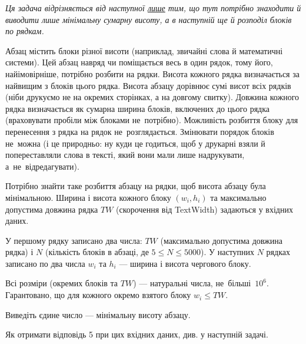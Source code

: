 ﻿{\it Ця задача відрізняється від наступної \underline{лише} тим, що тут потрібно знаходити й виводити лише мінімальну сумарну висоту, а в наступній ще й розподіл блоків по рядкам.}

Абзац містить блоки різної висоти (наприклад, звичайні слова й математичні системи). Цей абзац навряд чи поміщається весь в один рядок, тому його, найімовірніше, потрібно розбити на рядки. Висота кожного рядка визначається за найвищим з блоків цього рядка. Висота абзацу дорівнює сумі висот всіх рядків (ніби друкуємо не на окремих сторінках, а на довгому свитку). Довжина кожного рядка визначається як сумарна ширина блоків, включених до цього рядка (враховувати пробіли між блоками не~потрібно). Можливість розбиття блоку для перенесення з рядка на рядок не~розглядається. Змінювати порядок блоків не~можна (і це природньо: ну куди це годиться, щоб у друкарні взяли й попереставляли слова в тексті, який вони мали лише надрукувати, а~не~відредагувати).

Потрібно знайти таке розбиття абзацу на рядки, щоб висота абзацу була мінімальною. Ширина і висота кожного блоку $(w_i, h_i)$ та максимально допустима довжина рядка $TW$ (скорочення від TextWidth) задаються у вхідних даних.

\InputFile
У першому рядку записано два числа: $TW$ (максимально допустима довжина рядка) і $N$ (кількість блоків в абзаці, де $5\leqslant N\leqslant 5000$). 
У наступних $N$ рядках записано по два числа $w_i$ та $h_i$ — ширина і висота чергового блоку.

Всі розміри (окремих блоків та $TW$) — натуральні числа, не~більші~$10^6$. Гарантовано, що для кожного окремо взятого блоку $w_i\leqslant TW$.

\OutputFile
Виведіть єдине число — мінімальну висоту абзацу.

\Examples
\begin{example}    
\end{example}

\Note
Як отримати відповідь 5 при цих вхідних даних, див. у наступній задачі. 